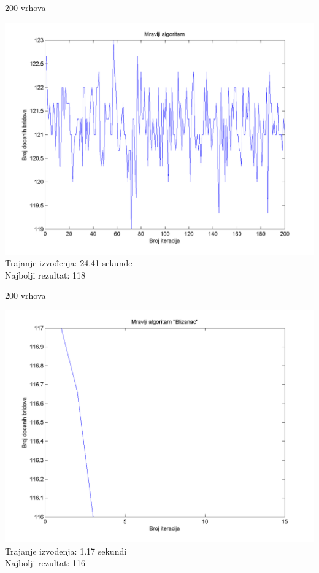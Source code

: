 \documentclass{beamer}
\begin{document}
\begin{frame}{200 vrhova}
\begin{center}
\includegraphics[scale = 0.4]{Mr200.png}\\
Trajanje izvođenja: 24.41 sekunde\\
Najbolji rezultat: 118\\
\end{center}
\end{frame}

\begin{frame}{200 vrhova}
\begin{center}
\includegraphics[scale = 0.4]{MrBl200.png}\\
Trajanje izvođenja: 1.17 sekundi\\
Najbolji rezultat: 116\\
\end{center}
\end{frame}
\end{document}
